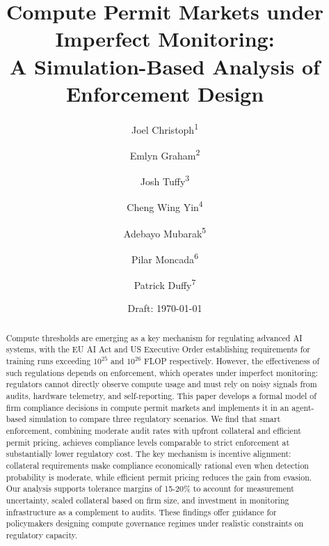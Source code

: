 \documentclass[12pt, a4paper]{article}
\title{Compute Permit Markets under Imperfect Monitoring: \\
A Simulation-Based Analysis of Enforcement Design}
\author{
    Joel Christoph\textsuperscript{1} \and
    Emlyn Graham\textsuperscript{2} \and
    Josh Tuffy\textsuperscript{3} \and
    Cheng Wing Yin\textsuperscript{4} \and
    Adebayo Mubarak\textsuperscript{5} \and
    Pilar Moncada\textsuperscript{6} \and
    Patrick Duffy\textsuperscript{7}
}
\date{Draft: \today}
\newcommand{\placeholder}[2]{%
    \begin{tcolorbox}[colback=yellow!10, colframe=orange!50, title={\textbf{#1}}]
    #2
    \end{tcolorbox}
}
\begin{document}

\maketitle


\begin{abstract}
\noindent Compute thresholds are emerging as a key mechanism for regulating advanced AI systems, with the EU AI Act and US Executive Order establishing requirements for training runs exceeding $10^{25}$ and $10^{26}$ FLOP respectively. However, the effectiveness of such regulations depends on enforcement, which operates under imperfect monitoring: regulators cannot directly observe compute usage and must rely on noisy signals from audits, hardware telemetry, and self-reporting. This paper develops a formal model of firm compliance decisions in compute permit markets and implements it in an agent-based simulation to compare three regulatory scenarios. We find that smart enforcement, combining moderate audit rates with upfront collateral and efficient permit pricing, achieves compliance levels comparable to strict enforcement at substantially lower regulatory cost. The key mechanism is incentive alignment: collateral requirements make compliance economically rational even when detection probability is moderate, while efficient permit pricing reduces the gain from evasion. Our analysis supports tolerance margins of 15-20\% to account for measurement uncertainty, scaled collateral based on firm size, and investment in monitoring infrastructure as a complement to audits. These findings offer guidance for policymakers designing compute governance regimes under realistic constraints on regulatory capacity.
\end{abstract}

\end{document}
